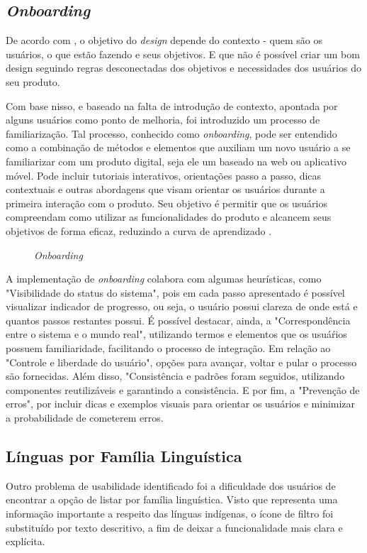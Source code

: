 \subsection{\textit{Onboarding}}
\label{sec:Onboarding}
De acordo com , o objetivo do \textit{design} depende do contexto - quem são os usuários, o que estão fazendo e seus objetivos. E que não é possível criar um bom design 
seguindo regras desconectadas dos objetivos e necessidades dos usuários do seu produto. 

Com base nisso, e baseado na falta de introdução de contexto, apontada por alguns usuários como ponto de 
melhoria, foi introduzido um processo de familiarização. Tal processo, conhecido como \textit{onboarding}, pode ser entendido como a combinação de métodos e elementos que auxiliam um novo usuário 
a se familiarizar com um produto digital, seja ele um baseado na web ou aplicativo móvel. Pode incluir tutoriais interativos, orientações passo a passo, dicas contextuais e outras abordagens que 
visam orientar os usuários durante a primeira interação com o produto. Seu objetivo é permitir que os usuários compreendam como utilizar as funcionalidades do produto e alcancem seus 
objetivos de forma eficaz, reduzindo a curva de aprendizado \cite{renz2014}.

\begin{figure}[h!]
	\centering
	\caption{\textit{Onboarding}}
	\label{fig22}
\end{figure}

A implementação de \textit{onboarding} colabora com algumas heurísticas, como "Visibilidade do status do sistema", pois em cada passo apresentado é possível visualizar indicador de progresso, ou seja, 
o usuário possui clareza de onde está e quantos passos restantes possui. É possível destacar, ainda, a "Correspondência entre o sistema e o mundo real", utilizando termos e elementos que os usuáŕios 
possuem familiaridade, facilitando o processo de integração. Em relação ao "Controle e liberdade do usuário", opções para avançar, voltar e pular o processo são fornecidas. Além disso, "Consistência e 
padrões foram seguidos, utilizando componentes reutilizáveis e garantindo a consistência. E por fim, a "Prevenção de erros", por incluir dicas e exemplos visuais para orientar os usuários e  minimizar 
a probabilidade de cometerem erros.

\subsection{Línguas por Família Linguística}
\label{sec:Familia Linguistica}
Outro problema de usabilidade identificado foi a dificuldade dos usuários de encontrar a opção de listar por família linguística. Visto que representa uma informação importante a respeito das línguas indígenas, 
o ícone de filtro foi substituído por texto descritivo, a fim de deixar a funcionalidade mais clara e explícita.

